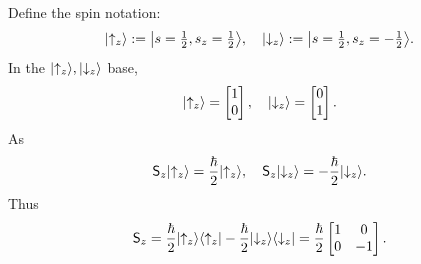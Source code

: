 \documentclass{article}
\newcommand*{\op}[1]{\mathsf{#1}}
\begin{document}
\noindent Define the spin notation:
$$\lvert\uparrow_z\rangle:=\bigl\lvert s=\textstyle\frac12,s_z=\frac12\bigr\rangle,\quad\lvert\downarrow_z\rangle:=\bigl\lvert s=\textstyle\frac12,s_z=-\frac12\bigr\rangle.$$
In the $\lvert\uparrow_z\rangle,\lvert\downarrow_z\rangle$ base,
\begin{align*}
	\lvert\uparrow_z\rangle=\begin{bmatrix}1\\0\end{bmatrix},\quad
	\lvert\downarrow_z\rangle=\begin{bmatrix}0\\1\end{bmatrix}.
\end{align*}
As
$$\op{S}_z\ket{\uparrow_z}=\frac{\hbar}2\ket{\uparrow_z},\quad\op{S}_z\ket{\downarrow_z}=-\frac{\hbar}2\ket{\downarrow_z}.$$
Thus
\begin{align*}
	\op{S}_z=\frac{\hbar}2\ktbr{\uparrow_z}{\uparrow_z}-\frac{\hbar}2\ktbr{\downarrow_z}{\downarrow_z}=\displaystyle\frac{\hbar}2\begin{bmatrix}1&0\\0&-1\end{bmatrix}.
\end{align*}
\end{document}
